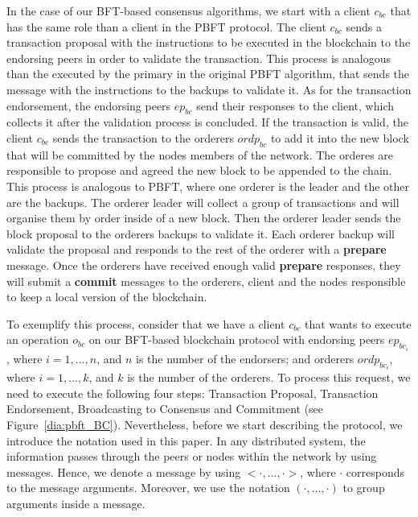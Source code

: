 \documentclass[conference]{llncs}
\begin{document}
In the case of our BFT-based consensus algorithms, we start with a client $c_{bc}$ that has the same role than a client in the PBFT protocol. The client $c_{bc}$ sends a transaction proposal with the instructions to be executed in the blockchain to the endorsing peers in order to validate the transaction. This process is analogous than the executed by the primary in the original PBFT algorithm, that sends the message with the instructions to the backups to validate it. As for the transaction endorsement, the endorsing peers $ep_{bc}$ send their responses to the client, which collects it after the validation process is concluded. If the transaction is valid, the client $c_{bc}$ sends the transaction to the orderers $ordp_{bc}$ to add it into the new block that will be committed by the nodes members of the network. The orderes are responsible to propose and agreed the new block to be appended to the chain. This process is analogous to PBFT, where one orderer is the leader and the other are the backups. The orderer leader will collect a group of transactions and will organise them by order inside of a new block. Then the orderer leader sends the block proposal to the orderers backups to validate it. Each orderer backup will validate the proposal and responds to the rest of the orderer with a \textbf{prepare} message. Once the orderers have received enough valid \textbf{prepare} responses, they will submit a \textbf{commit} messages to the orderers, client and the nodes responsible to keep a local version of the blockchain. 

To exemplify this process, consider that we have a client $c_{bc}$ that wants to execute an operation $o_{bc}$ on our BFT-based blockchain protocol with endorsing peers $ep_{bc_{i}}$, where $i=1,...,n$, and $n$ is the number of the endorsers; and orderers $ordp_{bc_{i}}$, where $i=1,...,k$, and $k$ is the number of the orderers. To process this request, we need to execute the following four steps: Transaction Proposal, Transaction Endorsement, Broadcasting to Consensus and Commitment (see Figure~\ref{dia:pbft_BC}). Nevertheless,  before we start describing the protocol, we introduce the notation used in this paper. In any distributed system, the information passes through the peers or nodes within the network by using messages. Hence, we  denote a message by using $<\cdot,...,\cdot>$, where $\cdot$ corresponds to the message arguments. Moreover, we use the notation $(\cdot,...,\cdot)$ to group arguments inside a message.
\end{document}
